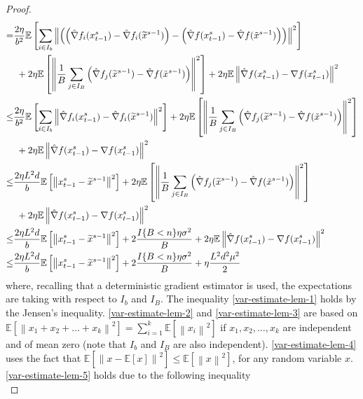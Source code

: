 \documentclass{article}
\newcommand*{\E}{\mathbb{E}}
\newcommand{\norm}[1]{\left\lVert#1\right\rVert}
\theoremstyle{definition}
\theoremstyle{remark}
\begin{document}
\begin{proof}
\begin{align}
   = &\notag\frac{2\eta}{b^2}\E\left[\sum_{i\in I_b}\norm{\left(\left(\hat{\nabla} f_i(x_{t-1}^s)-\hat{\nabla} f_i(\widetilde{x}^{s-1})\right) - \left({\hat{\nabla}} f(x_{t-1}^s) - \hat{\nabla} f(\tilde{x}^{s-1}) \right)\right)}^2\right]\\
   &\,\, \label{var-estimate-lem-3}+ 2\eta \E \left[ \norm{\frac{1}{B}\sum_{j\in I_B}\left(\hat{\nabla} f_j(\widetilde{x}^{s-1}) - \hat{\nabla} f(\tilde{x}^{s-1})\right)}^2\right]+2\eta \E \norm{\hat{\nabla} f(x_{t-1}^s)-\nabla f(x_{t-1}^s)}^2\\
   \leq  &\frac{2\eta}{b^2}\E\left[\sum_{i\in I_b}\norm{\hat{\nabla} f_i(x_{t-1}^s)-\hat{\nabla} f_i(\widetilde{x}^{s-1})}^2\right]+ 2\eta \E \left[ \norm{\frac{1}{B}\sum_{j\in I_B}\left(\hat{\nabla} f_j(\widetilde{x}^{s-1}) - \hat{\nabla} f(\tilde{x}^{s-1})\right)}^2\right]\notag\\
   &\,\,\label{var-estimate-lem-4}+2\eta \E \norm{\hat{\nabla} f(x_{t-1}^s)-\nabla f(x_{t-1}^s)}^2\\
    \leq  &\frac{2\eta L^2 d}{b}\E\left[\norm{x_{t-1}^s-\widetilde{x}^{s-1}}^2\right]+ 2\eta \E \left[ \norm{\frac{1}{B}\sum_{j\in I_B}\left(\hat{\nabla} f_j(\widetilde{x}^{s-1}) - \hat{\nabla} f(\tilde{x}^{s-1})\right)}^2\right]\notag\\
   &\,\,\label{var-estimate-lem-5}+2\eta \E \norm{\hat{\nabla} f(x_{t-1}^s)-\nabla f(x_{t-1}^s)}^2\\
   \leq  &\label{var-estimate-lem-6}\frac{2\eta L^2 d}{b}\E\left[\norm{x_{t-1}^s-\widetilde{x}^{s-1}}^2\right]+ 2\frac{I\{B < n\}\eta \sigma ^2}{B}+2\eta \E \norm{\hat{\nabla} f(x_{t-1}^s)-\nabla f(x_{t-1}^s)}^2\\
   \leq  &\label{var-estimate-lem-7}\frac{2\eta L^2 d}{b}\E\left[\norm{x_{t-1}^s-\widetilde{x}^{s-1}}^2\right]+ 2\frac{I\{B < n\}\eta \sigma ^2}{B}+\eta \frac{L^2 d^2 \mu^2}{2}
 \end{align}
 where, recalling that a deterministic gradient estimator is used, the expectations are taking with respect to $I_b$ and $I_B$. The inequality \eqref{var-estimate-lem-1} holds by the Jensen’s inequality. \eqref{var-estimate-lem-2} and \eqref{var-estimate-lem-3} are based on $\E[\norm{x_1+x_2+\ldots+x_k}^2] = \sum_{i=1}^k \E[\norm{x_i}^2]$ if $x_1,x_2,\ldots,x_k$ are independent and of mean zero (note that $I_b$ and $I_B$ are also independent). \eqref{var-estimate-lem-4} uses the fact that $\E[\norm{x-\E[x]}^2] \leq \E[\norm{x}^2]$, for any random variable $x$. \eqref{var-estimate-lem-5} holds due to the following inequality  
 \begin{equation}

\end{equation}
\end{proof}
\end{document}
